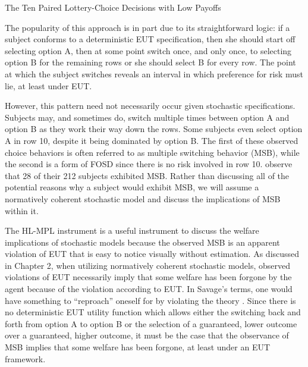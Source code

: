\documentclass[../main.tex]{subfiles}
\begin{document}
\begin{table}[ht]
	\centering
	\captionsetup{justification=centering}
	\caption{The Ten Paired Lottery-Choice Decisions with Low Payoffs \newline \textcite[1645]{Holt2002} }
	\label{tb:HL-MPL}
	\begin{adjustbox}{width=1\textwidth}
	\end{adjustbox}
\end{table}

The popularity of this approach is in part due to its straightforward logic:
if a subject conforms to a deterministic EUT specification, then she should start off selecting option A, then at some point switch once, and only once, to selecting option B for the remaining rows or she should select B for every row.
The point at which the subject switches reveals an interval in which preference for risk must lie, at least under EUT.

However, this pattern need not necessarily occur given stochastic specifications.
Subjects may, and sometimes do, switch multiple times between option A and option B as they work their way down the rows.
Some subjects even select option A in row 10, despite it being dominated by option B.
The first of these observed choice behaviors is often referred to as multiple switching behavior (MSB), while the second is a form of FOSD since there is no risk involved in row 10.
\textcite[1647]{Holt2002} observe that 28 of their 212 subjects exhibited MSB.
Rather than discussing all of the potential reasons why a subject would exhibit MSB, we will assume a normatively coherent stochastic model and discuss the implications of MSB within it.

The HL-MPL instrument is a useful instrument to discuss the welfare implications of stochastic models because the observed MSB is an apparent violation of EUT that is easy to notice visually without estimation.
As discussed in Chapter 2, when utilizing normatively coherent stochastic models, observed violations of EUT necessarily imply that some welfare has been forgone by the agent because of the violation according to EUT.
In Savage's terms, one would have something to \enquote{reproach} oneself for by violating the theory \parencite[230]{Moscati2016}.
Since there is no deterministic EUT utility function which allows either the switching back and forth from option A to option B or the selection of a guaranteed, lower outcome over a guaranteed, higher outcome, it must be the case that the observance of MSB implies that some welfare has been forgone, at least under an EUT framework.
\end{document}
